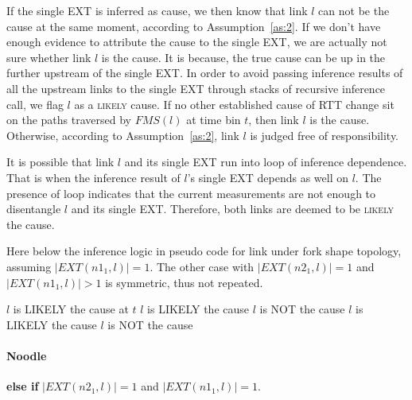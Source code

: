 If the single \ac{EXT} is inferred as cause, we then know that link $l$ can not be the cause at the same moment, according to Assumption~\ref{as:2}. If we don't have enough evidence to attribute the cause to the single \ac{EXT}, we are actually not sure whether link $l$ is the cause. It is because, the true cause can be up in the further upstream of the single \ac{EXT}. In order to avoid passing inference results of all the upstream links to the single \ac{EXT} through stacks of recursive inference call, we flag $l$ as a \textsc{likely} cause.
If no other established cause of RTT change sit on the paths traversed by $FMS(l)$ at time bin $t$, then link $l$ is the cause. Otherwise, according to Assumption~\ref{as:2}, link $l$ is judged free of responsibility.

It is possible that link $l$ and its single \ac{EXT} run into loop of inference dependence. That is when the inference result of $l$'s single \ac{EXT} depends as well on $l$. The presence of loop indicates that the current measurements are not enough to disentangle $l$ and its single \ac{EXT}. Therefore, both links are deemed to be \textsc{likely} the cause.

Here below the inference logic in pseudo code for link under fork shape topology, assuming $|EXT(n1_1,l)| = 1$. The other case with $|EXT(n2_1,l)| = 1$ and $|EXT(n1_1,l)| > 1$ is symmetric, thus not repeated.

\begin{algorithmic}
 
		\State $l$ is LIKELY the cause at $t$ 
	\Else {}
			\State $l$ is LIKELY the cause 
		\Else
				\State $l$ is NOT the cause 
			\Else
				\State $l$ is LIKELY the cause 
			\EndIf
		\EndIf
	\EndIf
\Else
	\State $l$ is NOT the cause
\EndIf
\end{algorithmic}

\paragraph{Noodle} \textbf{else if} $|EXT(n2_1,l)| = 1$ and $|EXT(n1_1,l)| = 1$.

